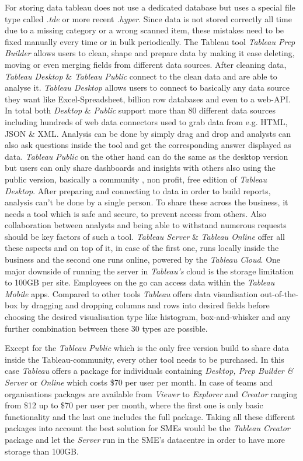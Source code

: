 \documentclass[../paper.tex]{subfiles}
\begin{document}
For storing data tableau does not use a dedicated database but uses a special file type called \textit{.tde} or more recent \textit{.hyper}. Since data is not stored correctly all time due to a missing category or a wrong scanned item, these mistakes need to be fixed manually every time or in bulk periodically. The Tableau tool \textit{Tableau Prep Builder} allows users to clean, shape and prepare data by making it ease deleting, moving or even merging fields from different data sources. After cleaning data, \textit{Tableau Desktop} \& \textit{Tableau Public} connect to the clean data and are able to analyse it. \textit{Tableau Desktop} allows users to connect to basically any data source they want like Excel-Spreadsheet, billion row databases and even to a web-API. In total both \textit{Desktop} \& \textit{Public} support more than 80 different data sources including hundreds of web data connectors used to grab data from e.g. HTML, JSON \& XML.  Analysis can be done by simply drag and drop and analysts can also ask questions inside the tool and get the corresponding answer displayed as data. \textit{Tableau Public} on the other hand can do the same as the desktop version but users can only share dashboards and insights with others also using the public version, basically a community , non profit, free edition of \textit{Tableau Desktop}. After preparing and connecting to data in order to build reports, analysis can't be done by a single person. To share these across the business, it needs a tool which is safe and secure, to prevent access from others. Also collaboration between analysts and being able to withstand numerous requests should be key factors of such a tool. \textit{Tableau Server} \& \textit{Tableau Online} offer all these aspects and on top of it, in case of the first one, runs locally inside the business and the second one runs online, powered by the \textit{Tableau Cloud}. One major downside of running the server in \textit{Tableau's} cloud is the storage limitation to 100GB per site. Employees on the go can access data within the \textit{Tableau Mobile} apps. Compared to other tools \textit{Tableau} offers data visualisation out-of-the-box by dragging and dropping columns and rows into desired fields before choosing the desired visualisation type like histogram, box-and-whisker and any further combination between these 30 types are possible.

Except for the \textit{Tableau Public} which is the only free version build to share data inside the Tableau-community, every other tool needs to be purchased. In this case \textit{Tableau} offers a package for individuals containing \textit{Desktop, Prep Builder \& Server} or \textit{Online} which costs \$70 per user per month. In case of teams and organisations packages are available from \textit{Viewer} to \textit{Explorer} and \textit{Creator} ranging from \$12 up to \$70 per user per month, where the first one is only basic functionality and the last one includes the full package. Taking all these different packages into account the best solution for SMEs would be the \textit{Tableau Creator} package and let the \textit{Server} run in the SME's datacentre in order to have more storage than 100GB.
\end{document}
